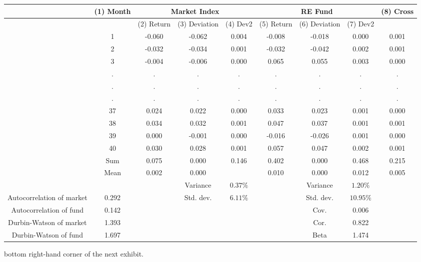 \documentclass[11pt]{article}
\begin{document}
\begin{center}
\begin{tabular}{|c|c|c|c|c|c|c|c|c|}
\hline
 & \multirow[b]{2}{*}{(1) Month} & \multicolumn{3}{|c|}{Market Index} & \multicolumn{3}{|c|}{RE Fund} & \multirow[b]{2}{*}{(8) Cross} \\
\hline
 &  & (2) Return & (3) Deviation & (4) Dev2 & (5) Return & (6) Deviation & (7) Dev2 &  \\
\hline
 & 1 & -0.060 & -0.062 & 0.004 & -0.008 & -0.018 & 0.000 & 0.001 \\
\hline
 & 2 & -0.032 & -0.034 & 0.001 & -0.032 & -0.042 & 0.002 & 0.001 \\
\hline
 & 3 & -0.004 & -0.006 & 0.000 & 0.065 & 0.055 & 0.003 & 0.000 \\
\hline
 & . & . & . & . & . & . & . & . \\
\hline
 & . & . & . & . & . & . & . & . \\
\hline
 & . & . & . & . & . & . & . & . \\
\hline
 & 37 & 0.024 & 0.022 & 0.000 & 0.033 & 0.023 & 0.001 & 0.000 \\
\hline
 & 38 & 0.034 & 0.032 & 0.001 & 0.047 & 0.037 & 0.001 & 0.001 \\
\hline
 & 39 & 0.000 & -0.001 & 0.000 & -0.016 & -0.026 & 0.001 & 0.000 \\
\hline
 & 40 & 0.030 & 0.028 & 0.001 & 0.057 & 0.047 & 0.002 & 0.001 \\
\hline
 & Sum & 0.075 & 0.000 & 0.146 & 0.402 & 0.000 & 0.468 & 0.215 \\
\hline
 & Mean & 0.002 & 0.000 &  & 0.010 & 0.000 & 0.012 & 0.005 \\
\hline
 &  &  & Variance & $0.37 \%$ &  & Variance & $1.20 \%$ &  \\
\hline
Autocorrelation of market & 0.292 &  & Std. dev. & $6.11 \%$ &  & Std. dev. & $10.95 \%$ &  \\
\hline
Autocorrelation of fund & 0.142 &  &  &  &  & Cov. & 0.006 &  \\
\hline
Durbin-Watson of market & 1.393 &  &  &  &  & Cor. & 0.822 &  \\
\hline
Durbin-Watson of fund & 1.697 &  &  &  &  & Beta & 1.474 &  \\
\hline
\end{tabular}
\end{center}

bottom right-hand corner of the next exhibit.
\end{document}
